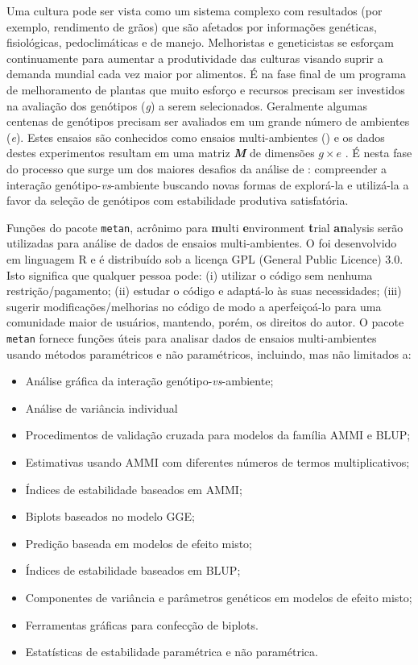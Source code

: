 \documentclass[
]{book}
\providecommand{\tightlist}{%
  \setlength{\itemsep}{0pt}\setlength{\parskip}{0pt}}
\numberwithin{equation}{section}
\newcommand{\indt}[1]{\index{#1|ST}}
\begin{document}
Uma cultura pode ser vista como um sistema complexo com resultados (por exemplo, rendimento de grãos) que são afetados por informações genéticas, fisiológicas, pedoclimáticas e de manejo. Melhoristas e geneticistas se esforçam continuamente para aumentar a produtividade das culturas visando suprir a demanda mundial cada vez maior por alimentos. É na fase final de um programa de melhoramento de plantas que muito esforço e recursos precisam ser investidos na avaliação dos genótipos (\emph{\emph{g}}) a serem selecionados. Geralmente algumas centenas de genótipos precisam ser avaliados em um grande número de ambientes (\emph{\emph{e}}). Estes ensaios são conhecidos como ensaios multi-ambientes (\indt{EMA}) e os dados destes experimentos resultam em uma matriz \textbf{\emph{M}} de dimensões \(g \times e\) . É nesta fase do processo que surge um dos maiores desafios da análise de \indt{EMA}: compreender a interação genótipo-\emph{vs}-ambiente buscando novas formas de explorá-la e utilizá-la a favor da seleção de genótipos com estabilidade \indt{estabilidade} produtiva satisfatória.

Funções do pacote \texttt{metan}, acrônimo para \textbf{m}ulti \textbf{e}nvironment \textbf{t}rial \textbf{an}alysis serão utilizadas para análise de dados de ensaios multi-ambientes\indt{EMA}. O foi desenvolvido em linguagem R e é distribuído sob a licença GPL (General Public Licence) 3.0. Isto significa que qualquer pessoa pode: (i) utilizar o código sem nenhuma restrição/pagamento; (ii) estudar o código e adaptá-lo às suas necessidades; (iii) sugerir modificações/melhorias no código de modo a aperfeiçoá-lo para uma comunidade maior de usuários, mantendo, porém, os direitos do autor. O pacote \texttt{metan} fornece funções úteis para analisar dados de ensaios multi-ambientes usando métodos paramétricos e não paramétricos, incluindo, mas não limitados a:

\begin{itemize}
\tightlist
\item
  Análise gráfica da interação genótipo-\emph{vs}-ambiente;
\item
  Análise de variância individual
\item
  Procedimentos de validação cruzada para modelos da família AMMI e BLUP;
\item
  Estimativas usando AMMI com diferentes números de termos multiplicativos;
\item
  Índices de estabilidade baseados em AMMI;
\item
  Biplots baseados no modelo GGE;
\item
  Predição baseada em modelos de efeito misto;
\item
  Índices de estabilidade baseados em BLUP;
\item
  Componentes de variância e parâmetros genéticos em modelos de efeito misto;
\item
  Ferramentas gráficas para confecção de biplots.
\item
  Estatísticas de estabilidade paramétrica e não paramétrica.
\end{itemize}
\end{document}
